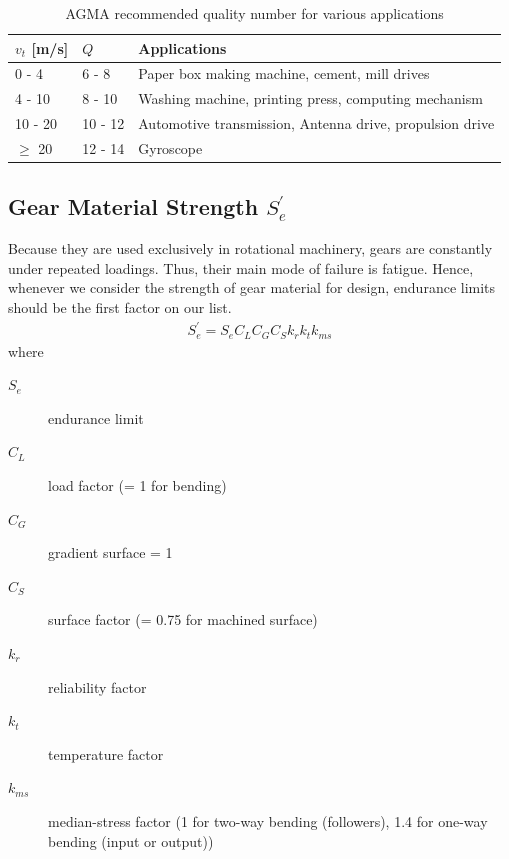 \documentclass[a4paper,openany]{tufte-book}
\begin{document}
\begin{table}[htbp]
\caption{\label{tab: AGMA recommended quality}AGMA recommended quality number for various applications}
\centering
\begin{tabular}{llp{5cm}}
\toprule
\(v_{t}\) [m/s] & \(Q\) & Applications\\
\midrule
0 - 4 & 6 - 8 & Paper box making machine, cement, mill drives\\
4 - 10 & 8 - 10 & Washing machine, printing press, computing mechanism\\
10 - 20 & 10 - 12 & Automotive transmission, Antenna drive, propulsion drive\\
\(\geqslant\) 20 & 12 - 14 & Gyroscope\\
\bottomrule
\end{tabular}
\end{table}

\subsection{Gear Material Strength \(S_e^{\prime}\)}
\label{sec:orgf7e54a2}

Because they are used exclusively in rotational machinery, gears are constantly under repeated loadings. Thus, their main mode of failure is fatigue. Hence, whenever we consider the strength of gear material for design, endurance limits should be the first factor on our list.
\begin{align}
  S_{e}^{\prime} = S_{e}C_{L}C_{G}C_{S}k_{r}k_{t}k_{ms}
\end{align}
where

\begin{description}
\item[{\(S_{e}\)}] endurance limit

\item[{\(C_{L}\)}] load factor (= 1 for bending)

\item[{\(C_{G}\)}] gradient surface = 1

\item[{\(C_{S}\)}] surface factor (= 0.75 for machined surface)

\item[{\(k_{r}\)}] reliability factor

\item[{\(k_{t}\)}] temperature factor

\item[{\(k_{ms}\)}] median-stress factor (1 for two-way bending (followers), 1.4 for one-way bending (input or output))
\end{description}
\end{document}
